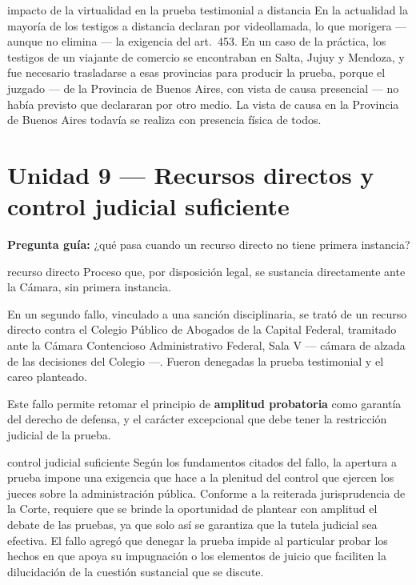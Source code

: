 \documentclass[12pt,oneside]{book}
\begin{document}
\begin{example}{impacto de la virtualidad en la prueba testimonial a distancia}
En la actualidad la mayoría de los testigos a distancia declaran por videollamada, lo que morigera --- aunque no elimina --- la exigencia del art.\ 453. En un caso de la práctica, los testigos de un viajante de comercio se encontraban en Salta, Jujuy y Mendoza, y fue necesario trasladarse a esas provincias para producir la prueba, porque el juzgado --- de la Provincia de Buenos Aires, con vista de causa presencial --- no había previsto que declararan por otro medio. La vista de causa en la Provincia de Buenos Aires todavía se realiza con presencia física de todos.
\end{example}

\section{Unidad 9 --- Recursos directos y control judicial suficiente}

\textbf{Pregunta guía:} ¿qué pasa cuando un recurso directo no tiene primera instancia?

\begin{definition}{recurso directo}
Proceso que, por disposición legal, se sustancia directamente ante la Cámara, sin primera instancia.
\end{definition}

En un segundo fallo, vinculado a una sanción disciplinaria, se trató de un recurso directo contra el Colegio Público de Abogados de la Capital Federal, tramitado ante la Cámara Contencioso Administrativo Federal, Sala V --- cámara de alzada de las decisiones del Colegio ---. Fueron denegadas la prueba testimonial y el careo planteado.

Este fallo permite retomar el principio de \textbf{amplitud probatoria} como garantía del derecho de defensa, y el carácter excepcional que debe tener la restricción judicial de la prueba.

\begin{definition}{control judicial suficiente}
Según los fundamentos citados del fallo, la apertura a prueba impone una exigencia que hace a la plenitud del control que ejercen los jueces sobre la administración pública. Conforme a la reiterada jurisprudencia de la Corte, requiere que se brinde la oportunidad de plantear con amplitud el debate de las pruebas, ya que solo así se garantiza que la tutela judicial sea efectiva. El fallo agregó que denegar la prueba impide al particular probar los hechos en que apoya su impugnación o los elementos de juicio que faciliten la dilucidación de la cuestión sustancial que se discute.
\end{definition}
\end{document}
